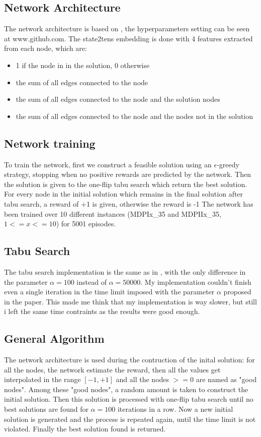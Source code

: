 \documentclass{article}
\begin{document}
\subsection{Network Architecture}
The network architecture is based on \cite{nijimbere2020tabu}, the
hyperparameters setting can be seen at www.github.com. The state2tens embedding
is done with 4 features extracted from each node, which are:
\begin{itemize}
  \item{1 if the node in in the solution, 0 otherwise}
  \item{the sum of all edges connected to the node}
  \item{the sum of all edges connected to the node and the solution nodes}
  \item{the sum of all edges connected to the node and the nodes not in the solution}
\end{itemize}

\subsection{Network training}
To train the network, first we construct a feasible solution using an
$\epsilon$-greedy strategy, stopping when no positive rewards are predicted by
the network.  Then the solution is given to the one-flip tabu search which
return the best solution.  For every node in the initial solution which remains
in the final solution after tabu search, a reward of +1 is given, otherwise the
reward is -1 The network has been trained over 10 different instances (MDPIx\_35
and MDPIIx\_35, $1 <= x <= 10$) for 5001 episodes.

\subsection{Tabu Search}
The tabu search implementation is the same as in \cite{nijimbere2020tabu}, with the only
difference in the parameter $\alpha = 100$ instead of $\alpha = 50000$. My
implementation couldn't finish even a single iteration in the time limit imposed
with the parameter $\alpha$ proposed in the paper. This made me think that my
implementation is way slower, but still i left the same
time contraints as the results were good enough.\\

\subsection{General Algorithm}
The network architecture is used during the contruction of the inital solution:
for all the nodes, the network estimate the reward, then all the values get
interpolated in the range $[-1,+1]$ and all the nodes $>= 0$ are named as "good
nodes". Among these "good nodes", a random amount is taken to construct the
initial solution. Then this solution is processed with one-flip tabu search
until no best solutions are found for $\alpha = 100$ iterations in a row.
Now a new initial solution is generated and the process is repeated again, until
the time limit is not violated. Finally the best solution found is returned.

% 



\end{document}
